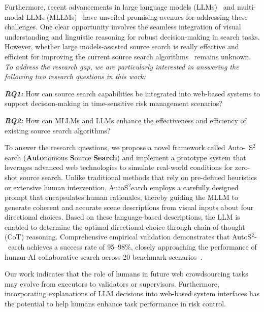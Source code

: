 Furthermore, recent advancements in large language models (LLMs)~\cite{chang2024survey} and multi-modal LLMs (MLLMs)~\cite{huang2023chatgpt} have unveiled promising avenues for addressing these challenges. One clear opportunity involves the seamless integration of visual understanding and linguistic reasoning for robust decision-making in search tasks. However, whether large models-assisted source search is really effective and efficient for improving the current source search algorithms~\cite{ji2022source} remains unknown. \textit{To address the research gap, we are particularly interested in answering the following two research questions in this work:}

\textbf{\textit{RQ1: }}How can source search capabilities be integrated into web-based systems to support decision-making in time-sensitive risk management scenarios? 

\textbf{\textit{RQ2: }}How can MLLMs and LLMs enhance the effectiveness and efficiency of existing source search algorithms? 


To answer the research questions, we propose a novel framework called Auto-\
S$^2$earch (\textbf{Auto}nomous \textbf{S}ource \textbf{Search}) and implement a prototype system that leverages advanced web technologies to simulate real-world conditions for zero-shot source search. Unlike traditional methods that rely on pre-defined heuristics or extensive human intervention, AutoS$^2$earch employs a carefully designed prompt that encapsulates human rationales, thereby guiding the MLLM to generate coherent and accurate scene descriptions from visual inputs about four directional choices. Based on these language-based descriptions, the LLM is enabled to determine the optimal directional choice through chain-of-thought (CoT) reasoning. Comprehensive empirical validation demonstrates that AutoS$^2$-\ 
earch achieves a success rate of 95–98\%, closely approaching the performance of human-AI collaborative search across 20 benchmark scenarios~\cite{zhao2023leveraging}. 

Our work indicates that the role of humans in future web crowdsourcing tasks may evolve from executors to validators or supervisors. Furthermore, incorporating explanations of LLM decisions into web-based system interfaces has the potential to help humans enhance task performance in risk control.





